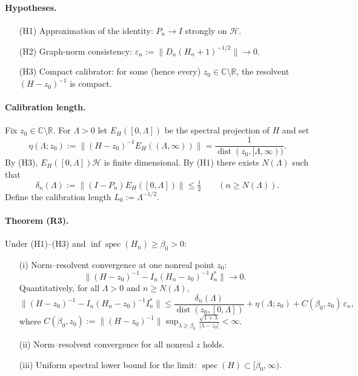 \documentclass[11pt]{amsart}
\begin{document}
\paragraph{Hypotheses.}
\begin{itemize}
  \item[(H1)] Approximation of the identity: $P_n\to I$ strongly on $\mathcal H$.
  \item[(H2)] Graph-norm consistency: $\varepsilon_n:=\bigl\| D_n (H_n+1)^{-1/2}\bigr\|\to 0$.
  \item[(H3)] Compact calibrator: for some (hence every) $z_0\in\mathbb C\setminus\mathbb R$, the resolvent $(H-z_0)^{-1}$ is compact.
\end{itemize}

\paragraph{Calibration length.}
Fix $z_0\in\mathbb C\setminus\mathbb R$. For $\Lambda>0$ let $E_H([0,\Lambda])$ be the spectral projection of $H$ and set
\[
  \eta(\Lambda;z_0):=\bigl\|(H-z_0)^{-1} E_H((\Lambda,\infty))\bigr\|=\frac{1}{\operatorname{dist}(z_0,[\Lambda,\infty))}.
\]
By (H3), $E_H([0,\Lambda])\mathcal H$ is finite dimensional. By (H1) there exists $N(\Lambda)$ such that
\[
  \delta_n(\Lambda):=\bigl\|(I-P_n) E_H([0,\Lambda])\bigr\|\le \tfrac12\qquad(n\ge N(\Lambda)).
\]
Define the calibration length $L_0:=\Lambda^{-1/2}$.

\paragraph{Theorem (R3).}
Under (H1)–(H3) and $\inf\operatorname{spec}(H_n)\ge \beta_0>0$:
\begin{itemize}
  \item[(i)] Norm–resolvent convergence at one nonreal point $z_0$:
  \[
    \bigl\|(H-z_0)^{-1} - I_n(H_n-z_0)^{-1} I_n^*\bigr\|\to 0.
  \]
  Quantitatively, for all $\Lambda>0$ and $n\ge N(\Lambda)$,
  \[
    \bigl\|(H-z_0)^{-1} - I_n(H_n-z_0)^{-1} I_n^*\bigr\|\le \frac{\delta_n(\Lambda)}{\operatorname{dist}(z_0,[0,\Lambda])}+\eta(\Lambda;z_0)+C(\beta_0,z_0)\,\varepsilon_n,
  \]
  where $C(\beta_0,z_0):=\bigl\|(H-z_0)^{-1}\bigr\|\sup_{\lambda\ge\beta_0} \frac{\sqrt{1+\lambda}}{|\lambda-z_0|}<\infty$.
  \item[(ii)] Norm–resolvent convergence for all nonreal $z$ holds.
  \item[(iii)] Uniform spectral lower bound for the limit: $\operatorname{spec}(H)\subset[\beta_0,\infty)$.
\end{itemize}
\end{document}
